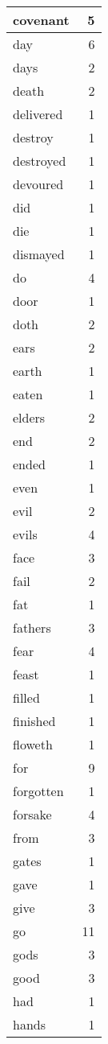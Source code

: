\begin{center}
\begin{longtable}{l|r}
covenant & 5 \\ \hline
day & 6 \\ \hline
days & 2 \\ \hline
death & 2 \\ \hline
delivered & 1 \\ \hline
destroy & 1 \\ \hline
destroyed & 1 \\ \hline
devoured & 1 \\ \hline
did & 1 \\ \hline
die & 1 \\ \hline
dismayed & 1 \\ \hline
do & 4 \\ \hline
door & 1 \\ \hline
doth & 2 \\ \hline
ears & 2 \\ \hline
earth & 1 \\ \hline
eaten & 1 \\ \hline
elders & 2 \\ \hline
end & 2 \\ \hline
ended & 1 \\ \hline
even & 1 \\ \hline
evil & 2 \\ \hline
evils & 4 \\ \hline
face & 3 \\ \hline
fail & 2 \\ \hline
fat & 1 \\ \hline
fathers & 3 \\ \hline
fear & 4 \\ \hline
feast & 1 \\ \hline
filled & 1 \\ \hline
finished & 1 \\ \hline
floweth & 1 \\ \hline
for & 9 \\ \hline
forgotten & 1 \\ \hline
forsake & 4 \\ \hline
from & 3 \\ \hline
gates & 1 \\ \hline
gave & 1 \\ \hline
give & 3 \\ \hline
go & 11 \\ \hline
gods & 3 \\ \hline
good & 3 \\ \hline
had & 1 \\ \hline
hands & 1 \\ \hline

\end{longtable}
\end{center}
